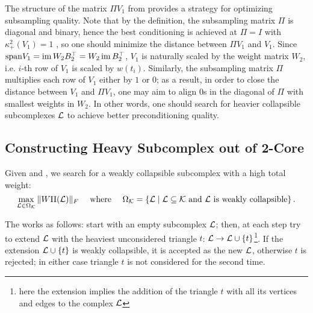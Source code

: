 \begin{proposition}\label{prop:heavy}
      The structure of the matrix \( \Pi V_1 \) from  provides a strategy for optimizing subsampling quality. Note that by the definition, the subsampling matrix \( \Pi \) is diagonal and binary, hence the best conditioning is achieved at \( \Pi = I \) with \( \kappa_+^2 (V_1) = 1 \) %
, so one should minimize the distance between \( \Pi V_1 \) and \( V_1 \). Since \( \mathrm{span} V_1 = \operatorname{im} W_2 B_2^\top = W_2 \operatorname{im} B_2^\top \), \( V_1 \) is naturally scaled by the weight matrix \( W_2 \), i.e. \(i\)-th row of \( V_1 \) is scaled by \( w(t_i) \). Similarly, the subsampling matrix \( \Pi \) multiplies each row of \( V_1 \) either by \( 1 \) or \( 0 \); as a result, in order to close the distance between \( V_1 \) and \( \Pi V_1 \), one may aim to align \( 0 \)s in the diagonal of \( \Pi \) with smallest weights in \( W_2 \). In other words, one should search for heavier collapsible subcomplexes \( \mathcal{L} \) to achieve better preconditioning quality.
\end{proposition}



\subsection{Constructing Heavy Subcomplex out of 2-Core}

Given  and , we search for a weakly collapsible subcomplex with a high total weight:
\begin{equation*}
      \max_{ \mathcal{L} \in \Omega_{\mathcal{K}} } \| W \Pi(\mathcal{L}) \|_F \quad \text{ where } \quad \Omega_{\mathcal{K}} = \left\{ \mathcal{L} \mid \mathcal{L} \subseteq \mathcal{K} \text{ and  } \mathcal{L} \text{ is weakly collapsible} \right\}.
\end{equation*}

The  works as follows: start with an empty subcomplex \( \mathcal{L} \); then, at each step try to extend \( \mathcal{L} \) with the heaviest unconsidered triangle \( t\): \( \mathcal{L} \to \mathcal{L} \cup \{ t \} \)\footnote{here the extension implies the addition of the triangle \(t\) with all its vertices and edges to the complex \(\mathcal{L}\)}. If the extension \( \mathcal{L} \cup \{ t \} \) is weakly collapsible, it is accepted as the new \( \mathcal{L} \), otherwise \( t \) is rejected; in either case triangle \(t\) is not considered for the second time.

